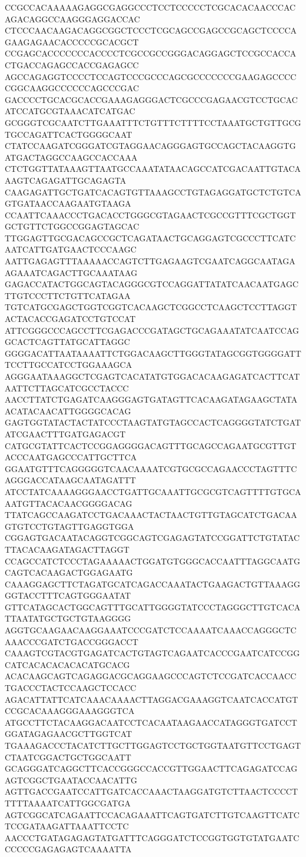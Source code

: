 CCGCCACAAAAAGAGGCGAGGCCCTCCTCCCCCTCGCACACAACCCACAGACAGGCCAAGGGAGGACCAC
CTCCCAACAAGACAGGCGGCTCCCTCGCAGCCGAGCCGCAGCTCCCCAGAAGAGAACACCCCCGCACGCT
CCGAGCACCCCCCCACCCCTCGCCGCCGGGACAGGAGCTCCGCCACCACTGACCAGAGCCACCGAGAGCC
AGCCAGAGGTCCCCTCCAGTCCCGCCCAGCGCCCCCCCGAAGAGCCCCCGGCAAGGCCCCCCAGCCCGAC
GACCCCTGCACGCACCGAAAGAGGGACTCGCCCGAGAACGTCCTGCACATCCATGCGTAAACATCATGAC
GCGGGTCGCAATCTTGAAATTTCTGTTTCTTTTCCTAAATGCTGTTGCGTGCCAGATTCACTGGGGCAAT
CTATCCAAGATCGGGATCGTAGGAACAGGGAGTGCCAGCTACAAGGTGATGACTAGGCCAAGCCACCAAA
CTCTGGTTATAAAGTTAATGCCAAATATAACAGCCATCGACAATTGTACAAAGTCAGAGATTGCAGAGTA
CAAGAGATTGCTGATCACAGTGTTAAAGCCTGTAGAGGATGCTCTGTCAGTGATAACCAAGAATGTAAGA
CCAATTCAAACCCTGACACCTGGGCGTAGAACTCGCCGTTTCGCTGGTGCTGTTCTGGCCGGAGTAGCAC
TTGGAGTTGCGACAGCCGCTCAGATAACTGCAGGAGTCGCCCTTCATCAATCATTGATGAACTCCCAAGC
AATTGAGAGTTTAAAAACCAGTCTTGAGAAGTCGAATCAGGCAATAGAAGAAATCAGACTTGCAAATAAG
GAGACCATACTGGCAGTACAGGGCGTCCAGGATTATATCAACAATGAGCTTGTCCCTTCTGTTCATAGAA
TGTCATGCGAGCTGGTCGGTCACAAGCTCGGCCTCAAGCTCCTTAGGTACTACACCGAGATCCTGTCCAT
ATTCGGGCCCAGCCTTCGAGACCCGATAGCTGCAGAAATATCAATCCAGGCACTCAGTTATGCATTAGGC
GGGGACATTAATAAAATTCTGGACAAGCTTGGGTATAGCGGTGGGGATTTCCTTGCCATCCTGGAAAGCA
AGGGAATAAAGGCTCGAGTCACATATGTGGACACAAGAGATCACTTCATAATTCTTAGCATCGCCTACCC
AACCTTATCTGAGATCAAGGGAGTGATAGTTCACAAGATAGAAGCTATAACATACAACATTGGGGCACAG
GAGTGGTATACTACTATCCCTAAGTATGTAGCCACTCAGGGGTATCTGATATCGAACTTTGATGAGACGT
CATGCGTATTCACTCCGGAGGGGACAGTTTGCAGCCAGAATGCGTTGTACCCAATGAGCCCATTGCTTCA
GGAATGTTTCAGGGGGTCAACAAAATCGTGCGCCAGAACCCTAGTTTCAGGGACCATAAGCAATAGATTT
ATCCTATCAAAAGGGAACCTGATTGCAAATTGCGCGTCAGTTTTGTGCAAATGTTACACAACGGGGACAG
TTATCAGCCAAGATCCTGACAAACTACTAACTGTTGTAGCATCTGACAAGTGTCCTGTAGTTGAGGTGGA
CGGAGTGACAATACAGGTCGGCAGTCGAGAGTATCCGGATTCTGTATACTTACACAAGATAGACTTAGGT
CCAGCCATCTCCCTAGAAAAACTGGATGTGGGCACCAATTTAGGCAATGCAGTCACAAGACTGGAGAATG
CAAAGGAGCTTCTAGATGCATCAGACCAAATACTGAAGACTGTTAAAGGGGTACCTTTCAGTGGGAATAT
GTTCATAGCACTGGCAGTTTGCATTGGGGTATCCCTAGGGCTTGTCACATTAATATGCTGCTGTAAGGGG
AGGTGCAAGAACAAGGAAATCCCGATCTCCAAAATCAAACCAGGGCTCAAACCCGATCTGACCGGGACCT
CAAAGTCGTACGTGAGATCACTGTAGTCAGAATCACCCGAATCATCCGGCATCACACACACACATGCACG
ACACAAGCAGTCAGAGGACGCAGGAAGCCCAGTCTCCGATCACCAACCTGACCCTACTCCAAGCTCCACC
AGACATTATTCATCAAACAAAACTTAGGACGAAAGGTCAATCACCATGTCCGCACAAAGGGAAAGGGTCA
ATGCCTTCTACAAGGACAATCCTCACAATAAGAACCATAGGGTGATCCTGGATAGAGAACGCTTGGTCAT
TGAAAGACCCTACATCTTGCTTGGAGTCCTGCTGGTAATGTTCCTGAGTCTAATCGGACTGCTGGCAATT
GCAGGGATCAGGCTTCACCGGGCCACCGTTGGAACTTCAGAGATCCAGAGTCGGCTGAATACCAACATTG
AGTTGACCGAATCCATTGATCACCAAACTAAGGATGTCTTAACTCCCCTTTTTAAAATCATTGGCGATGA
AGTCGGCATCAGAATTCCACAGAAATTCAGTGATCTTGTCAAGTTCATCTCCGATAAGATTAAATTCCTC
AACCCTGATAGAGAGTATGATTTCAGGGATCTCCGGTGGTGTATGAATCCCCCCGAGAGAGTCAAAATTA
